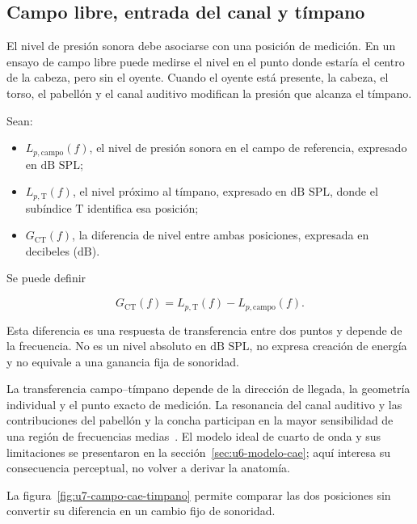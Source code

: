 \subsection{Campo libre, entrada del canal y tímpano}
\label{sec:u7-campo-timpano}

El nivel de presión sonora debe asociarse con una posición de medición. En un
ensayo de campo libre puede medirse el nivel en el punto donde estaría el
centro de la cabeza, pero sin el oyente. Cuando el oyente está presente, la
cabeza, el torso, el pabellón y el canal auditivo modifican la presión que
alcanza el tímpano.

Sean:

\begin{itemize}
    \item \(L_{p,\mathrm{campo}}(f)\), el nivel de presión sonora en el campo
    de referencia, expresado en \(\text{dB SPL}\);
    \item \(L_{p,\mathrm{T}}(f)\), el nivel próximo al tímpano,
    expresado en \(\text{dB SPL}\), donde el subíndice \(\mathrm{T}\)
    identifica esa posición;
    \item \(G_{\mathrm{CT}}(f)\), la diferencia de nivel entre ambas
    posiciones, expresada en decibeles (\(\text{dB}\)).
\end{itemize}

Se puede definir

\begin{equation}
    G_{\mathrm{CT}}(f)
      =L_{p,\mathrm{T}}(f)-L_{p,\mathrm{campo}}(f).
    \label{eq:u7-ganancia-campo-timpano}
\end{equation}

Esta diferencia es una respuesta de transferencia entre dos puntos y depende
de la frecuencia. No es un nivel absoluto en \(\text{dB SPL}\), no expresa
creación de energía y no equivale a una ganancia fija de sonoridad.

La transferencia campo--tímpano depende de la dirección de llegada,
la geometría individual y el punto exacto de medición. La resonancia del canal
auditivo y las contribuciones del pabellón y la concha participan en la mayor
sensibilidad de una región de frecuencias medias~\cite{carlini2024}. El modelo ideal de cuarto
de onda y sus limitaciones se presentaron en la
sección~\ref{sec:u6-modelo-cae}; aquí interesa su consecuencia perceptual, no
volver a derivar la anatomía.

La figura~\ref{fig:u7-campo-cae-timpano} permite comparar las dos posiciones
sin convertir su diferencia en un cambio fijo de sonoridad.

